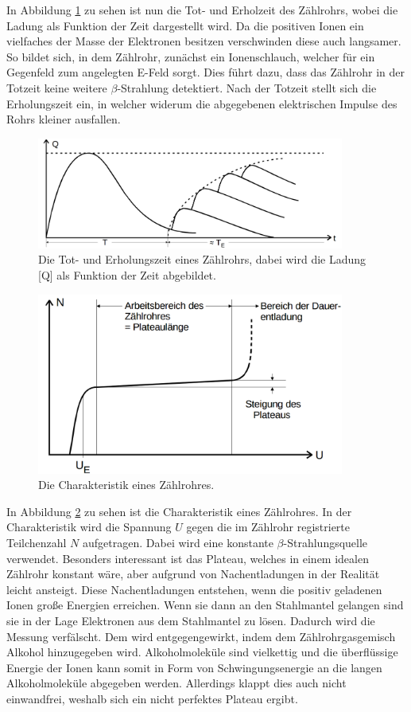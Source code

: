 \documentclass[
  bibliography=totoc,     %
  captions=tableheading,  %
  titlepage=firstiscover, %
]{scrartcl}
\begin{document}
In Abbildung \ref{fig:V7033} zu sehen ist nun die Tot- und Erholzeit des
Zählrohrs, wobei die Ladung als Funktion der Zeit dargestellt wird.
Da die positiven Ionen ein vielfaches der Masse der Elektronen besitzen
verschwinden diese auch langsamer. So bildet sich, in dem Zählrohr, zunächst ein
Ionenschlauch, welcher für ein Gegenfeld zum angelegten E-Feld sorgt. Dies führt dazu, dass das
Zählrohr in der Totzeit keine weitere $\beta$-Strahlung detektiert.
Nach der Totzeit stellt sich die Erholungszeit ein, in welcher widerum die
abgegebenen elektrischen Impulse des Rohrs kleiner ausfallen.
\clearpage
\begin{figure}[htb]
  \centering
  \includegraphics[width=0.9\textwidth]{V7033.png}
  \caption{Die Tot- und Erholungszeit eines Zählrohrs, dabei wird die Ladung [Q]
  als Funktion der Zeit abgebildet.}
  \label{fig:V7033}
\end{figure}
\begin{figure}[htb]
  \centering
  \includegraphics[width=0.9\textwidth]{V7034.png}
  \caption{Die Charakteristik eines Zählrohres.}
  \label{fig:V7034}
\end{figure}

In Abbildung \ref{fig:V7034} zu sehen ist die Charakteristik eines Zählrohres.
In der Charakteristik wird die Spannung $U$ gegen die im Zählrohr registrierte
Teilchenzahl $N$ aufgetragen. Dabei wird eine konstante $\beta$-Strahlungsquelle verwendet.
Besonders interessant ist das Plateau, welches in einem idealen Zählrohr
konstant wäre, aber aufgrund von Nachentladungen in der Realität leicht ansteigt.
Diese Nachentladungen entstehen, wenn die positiv geladenen Ionen große Energien
erreichen. Wenn sie dann an den Stahlmantel gelangen sind sie in der Lage
Elektronen aus dem Stahlmantel zu lösen. Dadurch wird die Messung verfälscht.
Dem wird entgegengewirkt, indem dem Zählrohrgasgemisch Alkohol hinzugegeben wird.
Alkoholmoleküle sind vielkettig und die überflüssige Energie der Ionen kann
somit in Form von Schwingungsenergie an die langen Alkoholmoleküle abgegeben werden.
Allerdings klappt dies auch nicht einwandfrei, weshalb sich ein nicht perfektes
Plateau ergibt.
\end{document}
